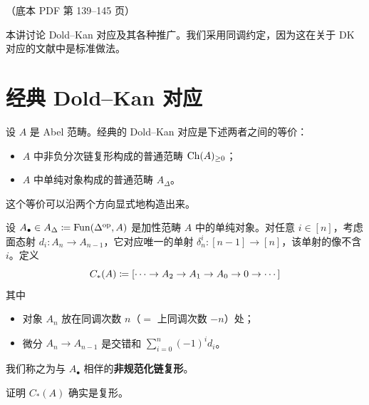 \begin{center}\small\color{black!55}（底本 PDF 第 139–145 页）\end{center}

本讲讨论 Dold–Kan 对应及其各种推广。我们采用同调约定，因为这在关于 DK 对应的文献中是标准做法。


\section{经典 Dold–Kan 对应}

\nitem\label{L18-1.1} 设 $A$ 是 Abel 范畴。经典的 Dold–Kan 对应是下述两者之间的等价：
\begin{itemize}[leftmargin=2.2em,itemsep=0.1em]
\item $A$ 中非负分次链复形构成的普通范畴 $\operatorname{Ch}(A)_{\ge 0}$；
\item $A$ 中单纯对象构成的普通范畴 $A_{\Delta}$。
\end{itemize}
这个等价可以沿两个方向显式地构造出来。

\begin{construction}\label{L18-1.2}
设 $A_{\bullet}\in A_{\Delta}\coloneqq\operatorname{Fun}(\Delta^{\mathrm{op}},A)$ 是加性范畴 $A$ 中的单纯对象。对任意 $i\in[n]$，考虑面态射 $d_{i}\colon A_{n}\to A_{n-1}$，它对应唯一的单射 $\delta^{i}_{n}\colon[n-1]\to[n]$，该单射的像不含 $i$。定义
\[
C_{*}(A)\coloneqq[\cdots\to A_{2}\to A_{1}\to A_{0}\to 0\to\cdots]
\]
其中
\begin{itemize}[leftmargin=2.2em,itemsep=0.1em]
\item 对象 $A_{n}$ 放在同调次数 $n$（$=$ 上同调次数 $-n$）处；
\item 微分 $A_{n}\to A_{n-1}$ 是交错和 $\sum_{i=0}^{n}(-1)^{i}d_{i}$。
\end{itemize}
我们称之为与 $A_{\bullet}$ 相伴的\textbf{非规范化链复形}。
\end{construction}

\begin{exercise}\label{L18-1.3}
证明 $C_{*}(A)$ 确实是复形。
\end{exercise}

